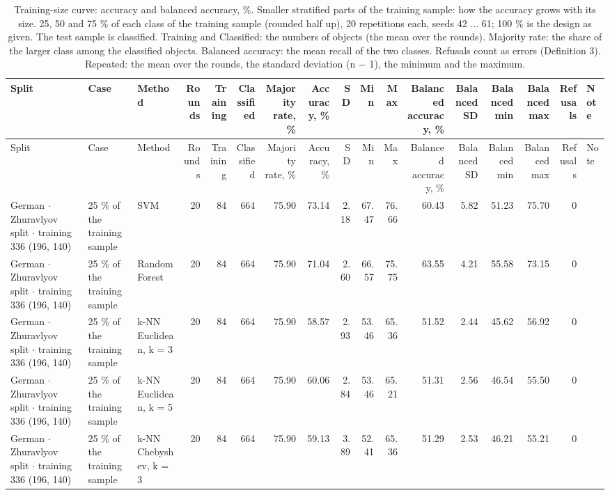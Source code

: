 \begin{longtable}{lllrrrrrrrrrrrrrl}
  \caption{Training-size curve: accuracy and balanced accuracy, \%. Smaller stratified parts of the training sample: how the accuracy grows with its size. 25, 50 and 75 \% of each class of the training sample (rounded half up), 20 repetitions each, seeds 42 $\ldots$ 61; 100 \% is the design as given. The test sample is classified. Training and Classified: the numbers of objects (the mean over the rounds). Majority rate: the share of the larger class among the classified objects. Balanced accuracy: the mean recall of the two classes. Refusals count as errors (Definition 3). Repeated: the mean over the rounds, the standard deviation (n $-$ 1), the minimum and the maximum.}\label{tab:size-curve} \\
  \toprule
  Split & Case & Method & Rounds & Training & Classified & Majority rate, \% & Accuracy, \% & SD & Min & Max & Balanced accuracy, \% & Balanced SD & Balanced min & Balanced max & Refusals & Note \\
  \midrule
  \endfirsthead
  \toprule
  Split & Case & Method & Rounds & Training & Classified & Majority rate, \% & Accuracy, \% & SD & Min & Max & Balanced accuracy, \% & Balanced SD & Balanced min & Balanced max & Refusals & Note \\
  \midrule
  \endhead
  \bottomrule
  \endfoot
  German $\cdot$ Zhuravlyov split $\cdot$ training 336 (196, 140) & 25 \% of the training sample & SVM & 20 & 84 & 664 & 75.90 & 73.14 & 2.18 & 67.47 & 76.66 & 60.43 & 5.82 & 51.23 & 75.70 & 0 &  \\
  German $\cdot$ Zhuravlyov split $\cdot$ training 336 (196, 140) & 25 \% of the training sample & Random Forest & 20 & 84 & 664 & 75.90 & 71.04 & 2.60 & 66.57 & 75.75 & 63.55 & 4.21 & 55.58 & 73.15 & 0 &  \\
  German $\cdot$ Zhuravlyov split $\cdot$ training 336 (196, 140) & 25 \% of the training sample & k-NN Euclidean, k = 3 & 20 & 84 & 664 & 75.90 & 58.57 & 2.93 & 53.46 & 65.36 & 51.52 & 2.44 & 45.62 & 56.92 & 0 &  \\
  German $\cdot$ Zhuravlyov split $\cdot$ training 336 (196, 140) & 25 \% of the training sample & k-NN Euclidean, k = 5 & 20 & 84 & 664 & 75.90 & 60.06 & 2.84 & 53.46 & 65.21 & 51.31 & 2.56 & 46.54 & 55.50 & 0 &  \\
  German $\cdot$ Zhuravlyov split $\cdot$ training 336 (196, 140) & 25 \% of the training sample & k-NN Chebyshev, k = 3 & 20 & 84 & 664 & 75.90 & 59.13 & 3.89 & 52.41 & 65.36 & 51.29 & 2.53 & 46.21 & 55.21 & 0 &  \\

\end{longtable}
